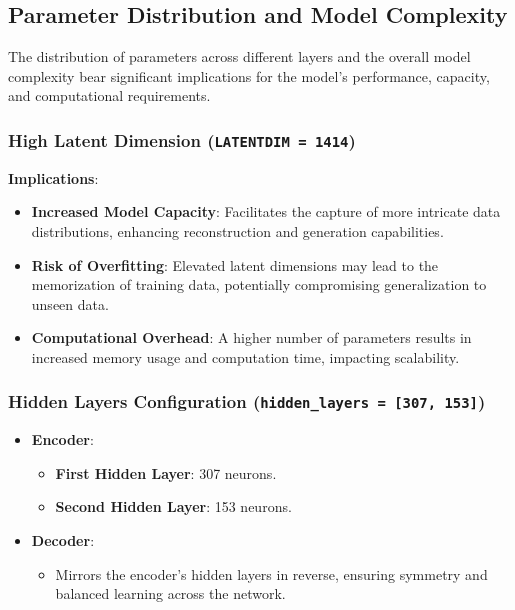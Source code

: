 \documentclass[10pt]{article}
\begin{document}
\subsection{Parameter Distribution and Model Complexity}

The distribution of parameters across different layers and the overall model complexity bear significant implications for the model's performance, capacity, and computational requirements.

\subsubsection{High Latent Dimension (\texttt{LATENTDIM = 1414})}

\textbf{Implications}:

\begin{itemize}
    \item \textbf{Increased Model Capacity}: Facilitates the capture of more intricate data distributions, enhancing reconstruction and generation capabilities.
    \item \textbf{Risk of Overfitting}: Elevated latent dimensions may lead to the memorization of training data, potentially compromising generalization to unseen data.
    \item \textbf{Computational Overhead}: A higher number of parameters results in increased memory usage and computation time, impacting scalability.
\end{itemize}

\subsubsection{Hidden Layers Configuration (\texttt{hidden\_layers = [307, 153]})}

\begin{itemize}
    \item \textbf{Encoder}:
    \begin{itemize}
        \item \textbf{First Hidden Layer}: 307 neurons.
        \item \textbf{Second Hidden Layer}: 153 neurons.
    \end{itemize}
    \item \textbf{Decoder}:
    \begin{itemize}
        \item Mirrors the encoder's hidden layers in reverse, ensuring symmetry and balanced learning across the network.
    \end{itemize}
\end{itemize}
\end{document}

